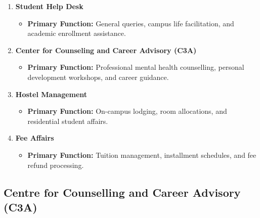 \begin{enumerate}[noitemsep, topsep=0pt]
    \item \textbf{Student Help Desk}
    \begin{itemize}
        \item \textbf{Primary Function:} General queries, campus life facilitation, and academic enrollment assistance.
    \end{itemize}

    \item \textbf{Center for Counseling and Career Advisory (C3A)}
    \begin{itemize}
        \item \textbf{Primary Function:} Professional mental health counselling, personal development workshops, and career guidance.
    \end{itemize}

    \item \textbf{Hostel Management}
    \begin{itemize}
        \item \textbf{Primary Function:} On-campus lodging, room allocations, and residential student affairs.
    \end{itemize}

    \item \textbf{Fee Affairs}
    \begin{itemize}
        \item \textbf{Primary Function:} Tuition management, installment schedules, and fee refund processing.
    \end{itemize}
\end{enumerate}

\subsection{Centre for Counselling and Career Advisory (C3A)}

